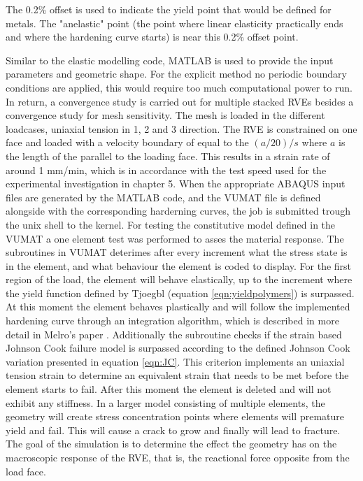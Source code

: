 The 0.2\% offset is used to indicate the yield point that would be defined for metals. The "anelastic" point (the point where linear elasticity practically ends and  where the hardening curve starts) is near this 0.2\% offset point. 


Similar to the elastic modelling code, MATLAB is used to provide the input parameters and geometric shape. For the explicit method no periodic boundary conditions are applied, this would require too much computational power to run. In return, a convergence study is carried out for multiple stacked RVEs besides a convergence study for mesh sensitivity. 
The mesh is loaded in the different loadcases, uniaxial tension in 1, 2 and 3 direction. The RVE is constrained on one face and loaded with a velocity boundary of equal to the $(a/20)/s$ where $a$ is the length of the parallel to the loading face. This results in a strain rate of around 1 mm/min, which is in accordance with the test speed used for the experimental investigation in chapter 5.
When the appropriate ABAQUS input files are generated by the MATLAB code, and the VUMAT file is defined alongside with the corresponding harderning curves, the job is submitted trough the unix shell to the kernel.
For testing the constitutive model defined in the VUMAT a one element test was performed to asses the material response. The subroutines in VUMAT deterimes after every increment what the stress state is in the element, and what behaviour the element is coded to display. For the first region of the load, the element will behave elastically, up to the increment where the yield function defined by Tjoegbl (equation \ref{eqn:yieldpolymers}) is surpassed. At this moment the element behaves plastically and will follow the implemented hardening curve through an integration algorithm, which is described in more detail in Melro's paper \cite{Melro2013MicromechanicalModelling}.  Additionally the subroutine checks if the strain based Johnson Cook failure model is surpassed according to the defined Johnson Cook variation presented in equation \ref{eqn:JC}. This criterion implements an uniaxial tension strain to determine an equivalent strain that needs to be met before the element starts to fail. After this moment the element is deleted and will not exhibit any stiffness. 
In a larger model consisting of multiple elements, the geometry will create stress concentration points where elements will premature yield and fail. This will cause a crack to grow and finally will lead to fracture. The goal of the simulation is to determine the effect the geometry has on the macroscopic response of the RVE, that is, the reactional force opposite from the load face.
